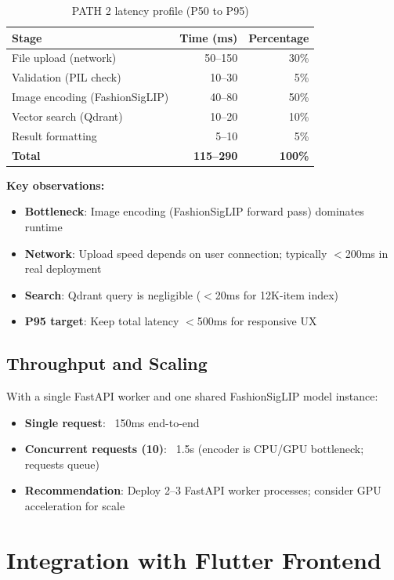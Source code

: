 \begin{table}[H]
\centering
\begin{tabular}{lrr}
\toprule
\textbf{Stage} & \textbf{Time (ms)} & \textbf{Percentage}\\
\midrule
File upload (network) & 50--150 & 30\% \\
Validation (PIL check) & 10--30 & 5\% \\
Image encoding (FashionSigLIP) & 40--80 & 50\% \\
Vector search (Qdrant) & 10--20 & 10\% \\
Result formatting & 5--10 & 5\% \\
\midrule
\textbf{Total} & \textbf{115--290} & \textbf{100\%} \\
\bottomrule
\end{tabular}
\caption{PATH 2 latency profile (P50 to P95)}
\label{tab:path2_latency}
\end{table}

\textbf{Key observations:}
\begin{itemize}
    \item \textbf{Bottleneck}: Image encoding (FashionSigLIP forward pass) dominates runtime
    \item \textbf{Network}: Upload speed depends on user connection; typically $<$200ms in real deployment
    \item \textbf{Search}: Qdrant query is negligible ($<$20ms for 12K-item index)
    \item \textbf{P95 target}: Keep total latency $<$500ms for responsive UX
\end{itemize}

\subsection{Throughput and Scaling}

With a single FastAPI worker and one shared FashionSigLIP model instance:
\begin{itemize}
    \item \textbf{Single request}: ~150ms end-to-end
    \item \textbf{Concurrent requests (10)}: ~1.5s (encoder is CPU/GPU bottleneck; requests queue)
    \item \textbf{Recommendation}: Deploy 2--3 FastAPI worker processes; consider GPU acceleration for scale
\end{itemize}

\section{Integration with Flutter Frontend}

